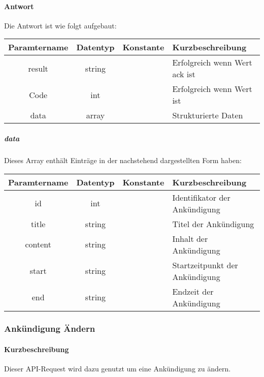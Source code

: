 \paragraph{Antwort}Die Antwort ist wie folgt aufgebaut:
\begin{table}[H]
	\begin{tabular}{|c|c|c|p{6.5cm}|}
		\hline
		\textbf{Paramtername} & \textbf{Datentyp} & \textbf{Konstante} & \textbf{Kurzbeschreibung}                                                                                               \\ \hline
		result              & string           &                 & Erfolgreich wenn Wert {\glqq ack\grqq} ist \\ \hline
		Code                & int              &                 & Erfolgreich wenn Wert {\glqq 0\grqq} ist \\ \hline
		data                & array            &                 & Strukturierte Daten \\ \hline
	\end{tabular}
\end{table}
\subparagraph{data}Dieses Array enthält Einträge in der nachstehend dargestellten Form haben:
\begin{table}[H]
	\begin{tabular}{|c|c|c|p{6.5cm}|}
		\hline
		\textbf{Paramtername} & \textbf{Datentyp} & \textbf{Konstante} & \textbf{Kurzbeschreibung}    \\ \hline
		id      & int               &                 & Identifikator der Ankündigung\\ \hline
		title   & string            &                 & Titel der Ankündigung \\ \hline
		content & string            &                 & Inhalt der Ankündigung \\ \hline
		start   & string            &                 & Startzeitpunkt der Ankündigung \\ \hline
		end     & string            &                 & Endzeit der Ankündigung \\ \hline
	\end{tabular}
\end{table}
\subsubsection{Ankündigung Ändern}
\paragraph{Kurzbeschreibung}Dieser API-Request wird dazu genutzt um eine Ankündigung zu ändern.
